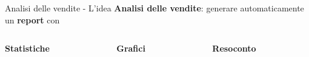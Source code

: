 \documentclass{beamer}
\begin{document}
	\begin{frame}{Analisi delle vendite - L'idea}
		\textbf{Analisi delle vendite}: generare automaticamente un \textbf{report} con

		\begin{columns}
			\begin{column}{0.33\textwidth}
				\begin{center}
					\textbf{Statistiche}
				\end{center}
			\end{column}
			\begin{column}{0.33\textwidth}
				\begin{center}
					\textbf{Grafici}
				\end{center}
			\end{column}
			\begin{column}{0.33\textwidth}
				\begin{center}
					\textbf{Resoconto}
				\end{center}
			\end{column}
		\end{columns}


\end{frame}
\end{document}
